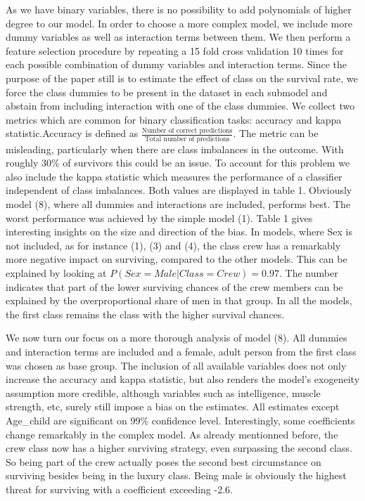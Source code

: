 \documentclass[
]{article}
\begin{document}
As we have binary variables, there is no possibility to add polynomials
of higher degree to our model. In order to choose a more complex model,
we include more dummy variables as well as interaction terms between
them. We then perform a feature selection procedure by repeating a 15
fold cross validation 10 times for each possible combination of dummy
variables and interaction terms. Since the purpose of the paper still is
to estimate the effect of class on the survival rate, we force the class
dummies to be present in the dataset in each submodel and abstain from
including interaction with one of the class dummies. We collect two
metrics which are common for binary classification tasks: accuracy and
kappa statistic.Accuracy is defined as
\(\frac{\text{Number of correct predictions}}{\text{Total number of predictions}}\).
The metric can be misleading, particularly when there are class
imbalances in the outcome. With roughly 30\% of survivors this could be
an issue. To account for this problem we also include the kappa
statistic which measures the performance of a classifier independent of
class imbalances. Both values are displayed in table 1. Obviously model
(8), where all dummies and interactions are included, performs best. The
worst performance was achieved by the simple model (1). Table 1 gives
interesting insights on the size and direction of the bias. In models,
where Sex is not included, as for instance (1), (3) and (4), the class
crew has a remarkably more negative impact on surviving, compared to the
other models. This can be explained by looking at
\(P(Sex = Male|Class = Crew) = 0.97\). The number indicates that part of
the lower surviving chances of the crew members can be explained by the
overproportional share of men in that group. In all the models, the
first class remains the class with the higher survival chances.

We now turn our focus on a more thorough analysis of model (8). All
dummies and interaction terms are included and a female, adult person
from the first class was chosen as base group. The inclusion of all
available variables does not only increase the accuracy and kappa
statistic, but also renders the model's exogeneity assumption more
credible, although variables such as intelligence, muscle strength, etc,
surely still impose a bias on the estimates. All estimates except
Age\_child are significant on 99\% confidence level. Interestingly, some
coefficients change remarkably in the complex model. As already
mentionned before, the crew class now has a higher surviving strategy,
even surpassing the second class. So being part of the crew actually
poses the second best circumstance on surviving besides being in the
luxury class. Being male is obviously the highest threat for surviving
with a coefficient exceeding -2.6.
\end{document}

